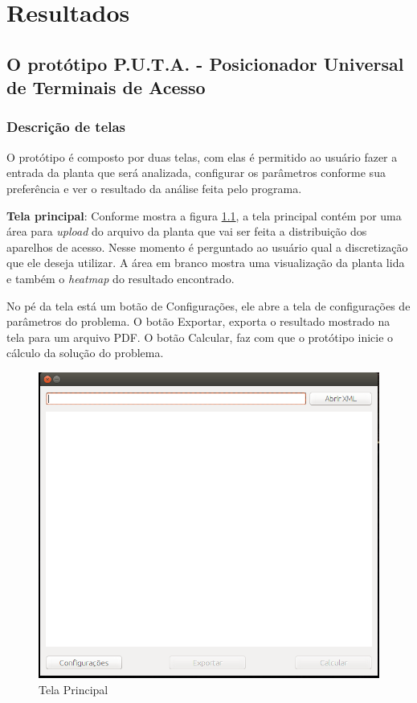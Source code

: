 \documentclass[tc,twoside]{iiufrgs}
\begin{document}
\chapter{Resultados} 

\section{O protótipo P.U.T.A. - Posicionador Universal de Terminais de Acesso}

\subsection{Descrição de telas}

O protótipo é composto por duas telas, com elas é permitido ao usuário fazer a entrada da planta que será analizada, configurar os parâmetros conforme sua preferência e ver o resultado da análise feita pelo programa.

\textbf{Tela principal}: Conforme mostra a figura \ref{fig:telaPrincipal}, a tela principal contém por uma área para \textit{upload} do arquivo da planta que vai ser feita a distribuição dos aparelhos de acesso. Nesse momento é perguntado ao usuário qual a discretização que ele deseja utilizar. A área em branco mostra uma visualização da planta lida e também o \textit{heatmap} do resultado encontrado.
 
No pé da tela está um botão de Configurações, ele abre a tela de configurações de parâmetros do problema. 
O botão Exportar, exporta o resultado mostrado na tela para um arquivo PDF. 
O botão Calcular, faz com que o protótipo inicie o cálculo da solução do problema.
 
\begin{figure}[!h]
	\centering
	\includegraphics[scale=0.4]{img/tela_principal.png}
	\caption{Tela Principal}
	\label{fig:telaPrincipal}
\end{figure}
\end{document}
